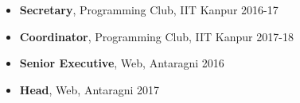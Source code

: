 
\begin{itemize}
  \item \textbf{Secretary}, Programming Club, IIT Kanpur 2016-17
  \item \textbf{Coordinator}, Programming Club, IIT Kanpur 2017-18
  \item \textbf{Senior Executive}, Web, Antaragni 2016
  \item \textbf{Head}, Web, Antaragni 2017
\end{itemize}
